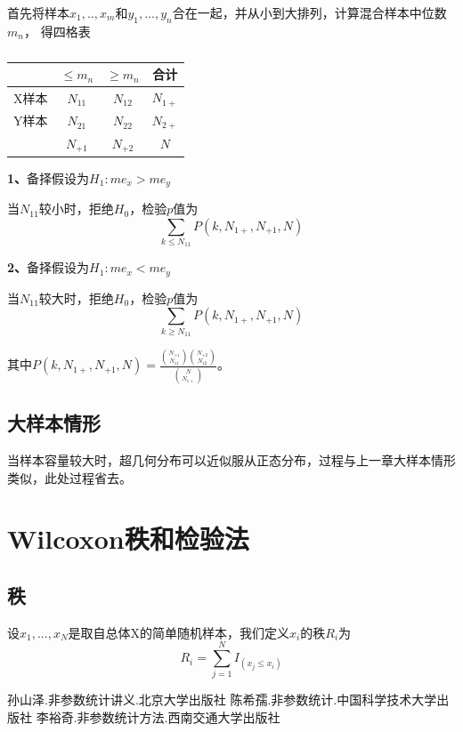 \documentclass[lang=cn,10pt]{elegantbook}
\begin{document}
首先将样本$x_1,..,x_m$和$y_1,...,y_n$合在一起，并从小到大排列，计算混合样本中位数$m_n$，
得四格表
\begin{table}[hp]
    \centering
    \caption{}
    \begin{tabular}{c|c|c|c}
              & $\leq m_n$ & $\geq m_n$ & 合计     \\
        \hline
        X样本 & $N_{11}$   & $N_{12}$   & $N_{1+}$ \\
        \hline
        Y样本 & $N_{21}$   & $N_{22}$   & $N_{2+}$ \\
        \hline
              & $N_{+1}$   & $N_{+2}$   & $N$      \\
    \end{tabular}
\end{table}

\textbf{1、}备择假设为$H_1:me_x> me_y$

当$N_{11}$较小时，拒绝$H_0$，检验$p$值为
$$
    \sum_{k\leq N_{11}}P(k,N_{1+},N_{+1},N)
$$

\textbf{2、}备择假设为$H_1:me_x< me_y$

当$N_{11}$较大时，拒绝$H_0$，检验$p$值为
$$
    \sum_{k\geq N_{11}}P(k,N_{1+},N_{+1},N)
$$

其中$P(k,N_{1+},N_{+1},N) = \frac{{N_{+1} \choose N_{11}}{N_{+2} \choose N_{12}}}
    {{N \choose N_{1+}}}$。

\subsection{大样本情形}
当样本容量较大时，超几何分布可以近似服从正态分布，过程与上一章大样本情形类似，此处过程省去。

\section{Wilcoxon秩和检验法}
\subsection{秩}
\begin{definition}
    设$x_1,...,x_{N}$是取自总体X的简单随机样本，我们定义$x_{i}$的秩$R_i$为
    \begin{equation}
        R_i = \sum_{j=1}^{N}I_{(x_{j}\leq{x_{i}})}
    \end{equation}
\end{definition}

\begin{thebibliography}{3}
    孙山泽.非参数统计讲义.北京大学出版社
    陈希孺.非参数统计.中国科学技术大学出版社
    李裕奇.非参数统计方法.西南交通大学出版社
\end{thebibliography}
\end{document}
